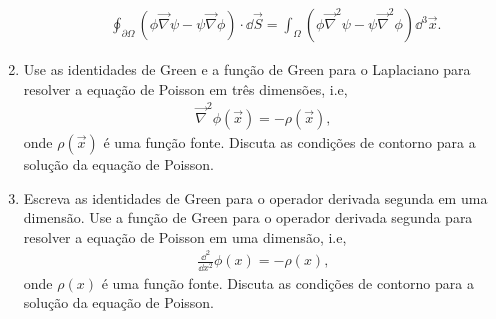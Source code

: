 \begin{enumerate}
\begin{enumerate}
		            \begin{align}
			            \oint_{\partial\Omega}\left(\phi\vec\nabla\psi-\psi\vec\nabla\phi\right)\cdot\dd\vec{S} =
			            \int_{\Omega}\left(\phi\vec\nabla^2\psi-\psi\vec\nabla^2\phi\right)\dd^3\vec{x}.
		            \end{align}
	      \end{enumerate}
	\item Use as identidades de Green e a função de Green para o Laplaciano para
	      resolver a equação de Poisson em três dimensões, i.e,
	      \begin{align}
		      \vec\nabla^2\phi(\vec{x}) = -\rho(\vec{x}),
	      \end{align}
	      onde $\rho(\vec{x})$ é uma função fonte. Discuta as condições de contorno
	      para a solução da equação de Poisson.
	\item Escreva as identidades de Green para o operador derivada segunda em
	      uma dimensão. Use a função de Green para o operador derivada segunda
	      para resolver a equação de Poisson em uma dimensão, i.e,
	      \begin{align}
		      \frac{\dd^2}{\dd x^2}\phi(x) = -\rho(x),
	      \end{align}
	      onde $\rho(x)$ é uma função fonte. Discuta as condições de contorno
	      para a solução da equação de Poisson.
\end{enumerate}

